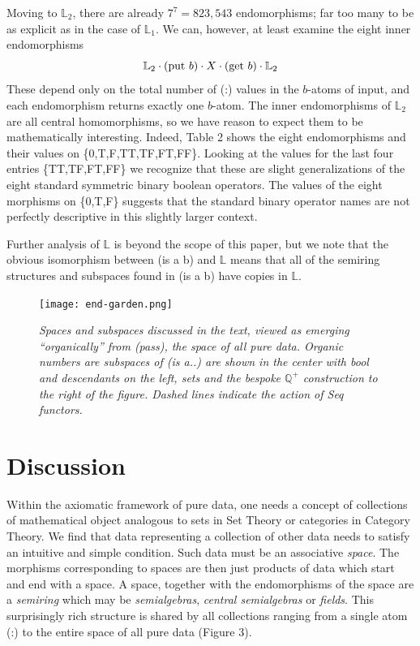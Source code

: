 \documentclass[11pt]{article}
\begin{document}
    Moving to ${\mathbb L}_2$, there are already $7^7=823,543$ endomorphisms; far too many to be as explicit as in the case of ${\mathbb L}_1$.  
 We can, however, at least examine the eight inner endomorphisms 
 \begin{equation}
 {\mathbb L}_2\cdot ({\rm put}\ b)\cdot X \cdot ({\rm get}\ b) \cdot {\mathbb L}_2
 \end{equation}
These depend only on the total number of (:) values in the $b$-atoms of input, and each 
endomorphism returns exactly one $b$-atom.  
The inner endomorphisms of ${\mathbb L}_2$ are all central homomorphisms, so we have reason to expect them to be
mathematically interesting.   
Indeed, Table 2 shows the eight endomorphisms and their values on \{0,T,F,TT,TF,FT,FF\}.  Looking at the values for the last four entries \{TT,TF,FT,FF\} 
we recognize that these are slight generalizations of the eight standard symmetric binary boolean operators.  The values of the eight morphisms 
on \{0,T,F\} suggests that the standard binary operator names are not perfectly descriptive in this slightly larger context.  

    Further analysis of ${\mathbb L}$ is beyond the scope of this paper, but we note that the obvious isomorphism between (is a b) and ${\mathbb L}$ 
means that all of the semiring structures and subspaces found in (is a b) have copies in ${\mathbb L}$.  

\begin{figure}[h]
\centering
\texttt{[image: end-garden.png]}
\caption{{\it Spaces and subspaces discussed in the text, viewed as emerging ``organically'' from (pass), the space of all pure data. 
Organic numbers are subspaces of (is a..) are shown in the center with bool and descendants on the left, sets and the bespoke
${\mathbb Q}^+$ construction to the right of the figure.  Dashed lines indicate the action of Seq functors.}}
\end{figure}

\section{Discussion} 

      Within the axiomatic framework of pure data, one needs a concept of collections of mathematical object analogous to sets in Set Theory or categories 
in Category Theory.   We find that data representing a collection of other data needs to satisfy an intuitive and simple condition.  Such data must 
be an associative {\it space}.  The morphisms corresponding to spaces are then just products of data which start and end with a space.  
A space, together with the endomorphisms of the space are a {\it semiring} which may be {\it semialgebras}, {\it central semialgebras} or 
{\it fields}.  This surprisingly rich structure is shared by all collections ranging from a single atom (:) to the entire space of all pure data (Figure 3).  
\end{document}
